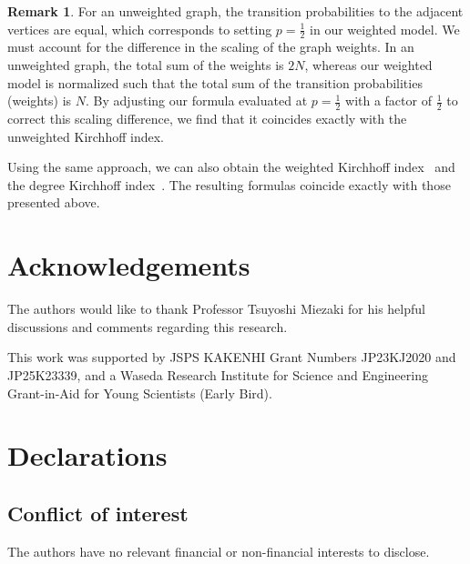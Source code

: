 \documentclass[12pt, leqno]{amsart}
\numberwithin{equation}{section}
\theoremstyle{plain}
\theoremstyle{definition}
\newtheorem{rem}{Remark}[section]
\newcommand{\0}{\mathbf{0}}
\begin{document}
\begin{rem}
For an unweighted graph, the transition probabilities to the adjacent vertices are equal, which corresponds to setting $p=\frac{1}{2}$ in our weighted model. 
We must account for the difference in the scaling of the graph weights.
In an unweighted graph, the total sum of the weights is $2N$, whereas our weighted model is normalized such that the total sum of the transition probabilities (weights) is $N$.
By adjusting our formula evaluated at $p=\frac{1}{2}$ with a factor of $\frac{1}{2}$ to correct this scaling difference, we find that it coincides exactly with the unweighted Kirchhoff index.
\end{rem}

Using the same approach, we can also obtain the weighted Kirchhoff index~\cite{MMS} and the degree Kirchhoff index~\cite{CZ, ZW}.
The resulting formulas coincide exactly with those presented above.

\section*{Acknowledgements}

The authors would like to thank Professor Tsuyoshi Miezaki for his helpful discussions and comments regarding this research. 

This work was supported by JSPS KAKENHI Grant Numbers JP23KJ2020 and JP25K23339, and a Waseda Research Institute for Science and Engineering Grant-in-Aid for Young Scientists (Early Bird). 


\section*{Declarations}

\subsection*{Conflict of interest}

The authors have no relevant financial or non-financial interests to disclose.
\end{document}

